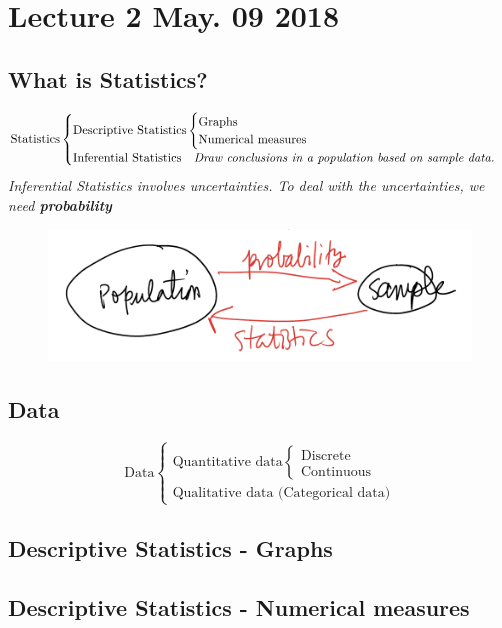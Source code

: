 \documentclass{article}
\begin{document}
	
	\section{Lecture 2 May. 09 2018}
	\subsection{What is Statistics?}
		\[
			\text{Statistics}
				\begin{cases}
					\text{Descriptive Statistics}
						\begin{cases}
							\text{Graphs} \\
							\text{Numerical measures} \\
						\end{cases}
					\\
					\text{Inferential Statistics} \quad \emph{Draw conclusions in a population based on sample data.}
				\end{cases}
		\]
		\emph{Inferential Statistics involves uncertainties. To deal with the uncertainties, we need \textbf{probability}}
		\begin{figure}[h]
			\centering
			\includegraphics[width=0.6\linewidth]{fig1.png}
		\end{figure}
		
	\subsection{Data}
		\[
			\text{Data}
			\begin{cases}
				\text{Quantitative data}
					\begin{cases}
						\text{Discrete}\\
						\text{Continuous}
					\end{cases}
					\\
				\text{Qualitative data (Categorical data)}
			\end{cases}
		\]
		
	\subsection{Descriptive Statistics - Graphs}
	
	\subsection{Descriptive Statistics - Numerical measures}
\end{document}
